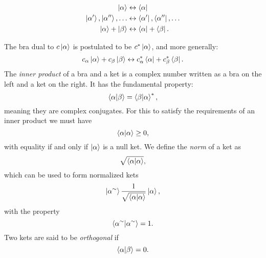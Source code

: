 \begin{equation}
\begin{split}
\ket{\alpha} &\leftrightarrow \bra{\alpha} \\
\ket{\alpha '}, \ket{\alpha ''},\dots &\leftrightarrow \bra{\alpha '}, 
    \bra{\alpha ''},\dots \\
\ket{\alpha} + \ket{\beta} &\leftrightarrow \bra{\alpha} + \bra{\beta} .
\end{split}
\end{equation}

The bra dual to $c \ket{\alpha}$ is postulated to be $c^* \ket{\alpha}$,
and more generally:
$$ c_{\alpha} \ket{\alpha} + c_{\beta} \ket{\beta} \leftrightarrow
c_{\alpha}^* \bra{\alpha} + c_{\beta}^* \bra{\beta} .$$
The \textit{inner product} of a bra and a ket is a complex number
written as a bra on the left and a ket on the right.
It has the fundamental property:
$$ \braket{\alpha | \beta} = \braket{\beta | \alpha}^* ,$$
meaning they are complex conjugates.
For this to satisfy the requirements of an inner product we must have
$$ \braket{\alpha | \alpha} \geq 0 ,$$
with equality if and only if $\ket{\alpha}$ is a null ket.
We define the \textit{norm} of a ket as
$$ \sqrt{\braket{\alpha | \alpha}} ,$$
which can be used to form normalized kets
$$ \ket{\alpha^{\sim}} \frac{1}{\sqrt{\braket{\alpha | \alpha}}} \ket{\alpha} ,$$
with the property
$$ \braket{\alpha^{\sim} | \alpha^{\sim}} = 1 .$$
Two kets are said to be \textit{orthogonal} if
$$ \braket{\alpha | \beta} = 0 .$$

